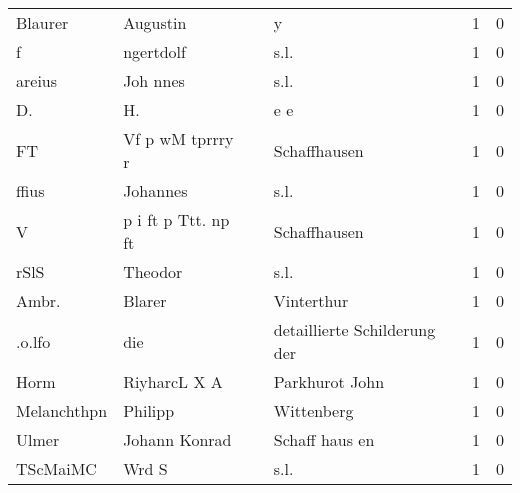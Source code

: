 \documentclass[10pt,a4paper,landscape]{article}
\begin{document}
\begin{longtable}{llllrr}
                  Blaurer &                           Augustin &             &                                           y &          1 &         0 \\
                        f &                          ngertdolf &             &                                        s.l. &          1 &         0 \\
                   areius &                           Joh nnes &             &                                        s.l. &          1 &         0 \\
                       D. &                                 H. &             &                                         e e &          1 &         0 \\
                       FT &                   Vf p wM tprrry r &             &                                Schaffhausen &          1 &         0 \\
                    ffius &                           Johannes &             &                                        s.l. &          1 &         0 \\
                        V &                p i ft p Ttt. np ft &             &                                Schaffhausen &          1 &         0 \\
                     rSlS &                            Theodor &             &                                        s.l. &          1 &         0 \\
                    Ambr. &                             Blarer &             &                                  Vinterthur &          1 &         0 \\
                   .o.lfo &                                die &             &                detaillierte Schilderung der &          1 &         0 \\
                     Horm &                       RiyharcL X A &             &                              Parkhurot John &          1 &         0 \\
              Melanchthpn &                            Philipp &             &                                  Wittenberg &          1 &         0 \\
                    Ulmer &                      Johann Konrad &             &                              Schaff haus en &          1 &         0 \\
                 TScMaiMC &                              Wrd S &             &                                        s.l. &          1 &         0 \\

\end{longtable}
\end{document}
